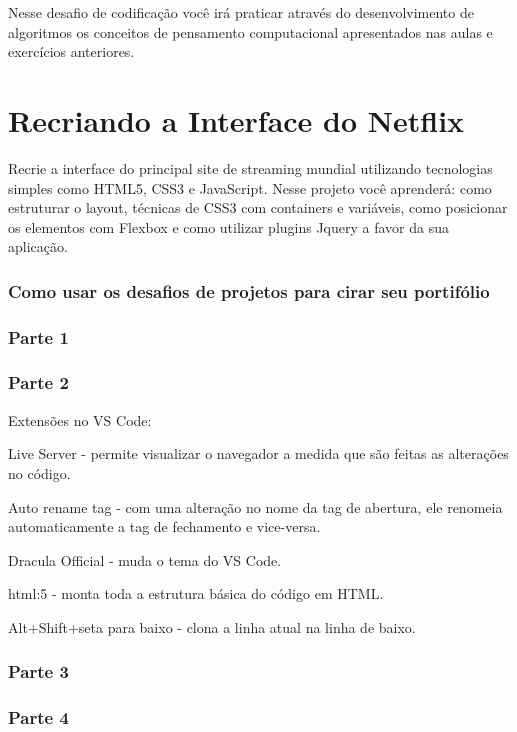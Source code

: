 \documentclass[12pt,a4paper]{article}
\begin{document}
	Nesse desafio de codificação você irá praticar através do desenvolvimento de algoritmos os conceitos de pensamento computacional apresentados nas aulas e exercícios anteriores.
	
	\section{Recriando a Interface do Netflix}
	
	Recrie a interface do principal site de streaming mundial utilizando tecnologias simples como HTML5, CSS3 e JavaScript. Nesse projeto você aprenderá: como estruturar o layout, técnicas de CSS3 com containers e variáveis, como posicionar os elementos com Flexbox e como utilizar plugins Jquery a favor da sua aplicação.
	
	\subsubsection{Como usar os desafios de projetos para cirar seu portifólio}
	
	\subsubsection{Parte 1}
	
	\subsubsection{Parte 2}
	
	Extensões no VS Code: 
	
	Live Server  - permite visualizar o navegador a medida que são feitas as alterações no código.
	
	Auto rename tag - com uma alteração no nome da tag de abertura, ele renomeia automaticamente a tag de fechamento e vice-versa.
	
	Dracula Official - muda o tema do VS Code.
	
	html:5 - monta toda a estrutura básica do código em HTML.
	
	Alt+Shift+seta para baixo - clona a linha atual na linha de baixo.
	
	\subsubsection{Parte 3}
	
	\subsubsection{Parte 4}
	
\end{document}
